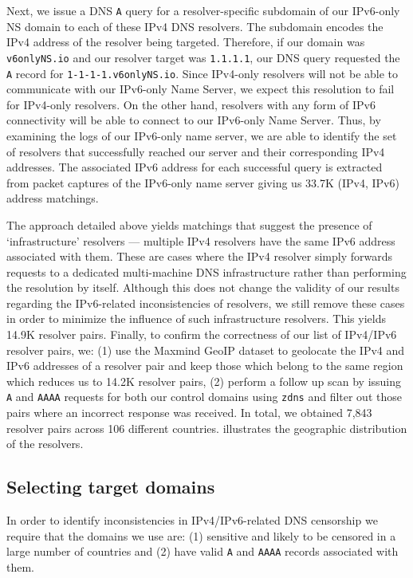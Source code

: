Next, we issue a DNS {\tt A} query for a resolver-specific subdomain of our
IPv6-only NS domain to each of these IPv4 DNS resolvers. The subdomain encodes
the IPv4 address of the resolver being targeted. Therefore, if our domain was
{\tt v6onlyNS.io} and our resolver target was {\tt 1.1.1.1}, our DNS query
requested the {\tt A} record for {\tt 1-1-1-1.v6onlyNS.io}.
%
Since IPv4-only resolvers will not be able to communicate with our IPv6-only
Name Server, we expect this resolution to fail for IPv4-only resolvers.
On the other hand, resolvers with any form of IPv6 connectivity will be
able to connect to our IPv6-only Name Server.
%
Thus, by examining the logs of our IPv6-only name server, we are able
to identify the set of resolvers that successfully reached our server and
their corresponding IPv4 addresses. The associated IPv6 address for each
successful query is extracted from packet captures of the IPv6-only name
server giving us 33.7K (IPv4, IPv6) address matchings.

The approach detailed above yields matchings that suggest the presence of
`infrastructure' resolvers --- \eg multiple IPv4 resolvers have the same IPv6
address associated with them. These are cases where the IPv4 resolver simply
forwards requests to a dedicated multi-machine DNS infrastructure rather than
performing the resolution by itself. Although this does not change the validity
of our results regarding the IPv6-related inconsistencies of resolvers, we
still remove these cases in order to minimize the influence of such
infrastructure resolvers. This yields 14.9K resolver pairs.
%
Finally, to confirm the correctness of our list of IPv4/IPv6 resolver pairs, we:
(1) use the Maxmind GeoIP dataset \cite{maxmind-connectiondb} to geolocate the
IPv4 and IPv6 addresses of a resolver pair and keep those which belong to the
same region which reduces us to 14.2K resolver pairs, (2) perform a follow up
scan by issuing {\tt A} and {\tt AAAA} requests for both our control domains
using {\tt zdns} \cite{Durumeric13zmap} and filter out those pairs where an
incorrect response was received.
% 
In total, we obtained 7,843 resolver pairs across 106 different countries.
 illustrates the geographic distribution of the
resolvers.


\subsection{Selecting target domains}
\label{sec:v4vsv6-methodology:domains}
In order to identify inconsistencies in IPv4/IPv6-related DNS censorship we
require that the domains we use are: (1) sensitive and likely to be censored in
a large number of countries and (2) have valid {\tt A} and {\tt AAAA} records
associated with them.

